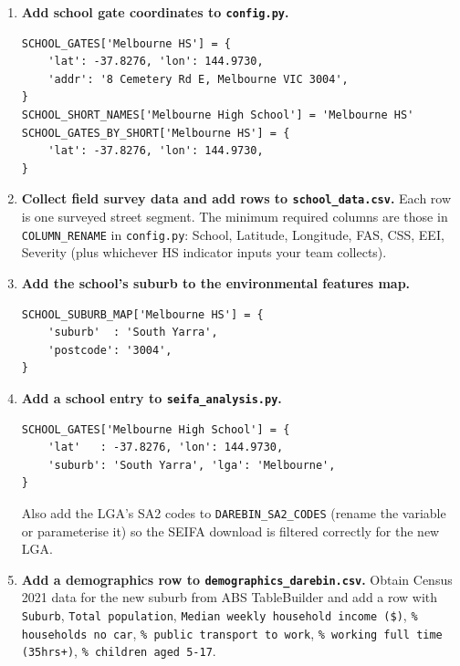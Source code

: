 \documentclass[11pt,a4paper,openany]{book}
\begin{document}
\begin{enumerate}

\item \textbf{Add school gate coordinates to \texttt{config.py}.}

\begin{lstlisting}[style=python, caption={config.py additions for a new school.}]
SCHOOL_GATES['Melbourne HS'] = {
    'lat': -37.8276, 'lon': 144.9730,
    'addr': '8 Cemetery Rd E, Melbourne VIC 3004',
}
SCHOOL_SHORT_NAMES['Melbourne High School'] = 'Melbourne HS'
SCHOOL_GATES_BY_SHORT['Melbourne HS'] = {
    'lat': -37.8276, 'lon': 144.9730,
}
\end{lstlisting}

\item \textbf{Collect field survey data and add rows to \texttt{school\_data.csv}.}
  Each row is one surveyed street segment.  The minimum required columns are those
  in \texttt{COLUMN\_RENAME} in \texttt{config.py}: School, Latitude, Longitude,
  FAS, CSS, EEI, Severity (plus whichever HS indicator inputs your team collects).

\item \textbf{Add the school's suburb to the environmental features map.}

\begin{lstlisting}[style=python, caption={environmental\_features.py suburb mapping addition.}]
SCHOOL_SUBURB_MAP['Melbourne HS'] = {
    'suburb'  : 'South Yarra',
    'postcode': '3004',
}
\end{lstlisting}

\item \textbf{Add a school entry to \texttt{seifa\_analysis.py}.}

\begin{lstlisting}[style=python, caption={seifa\_analysis.py school gate addition.}]
SCHOOL_GATES['Melbourne High School'] = {
    'lat'   : -37.8276, 'lon': 144.9730,
    'suburb': 'South Yarra', 'lga': 'Melbourne',
}
\end{lstlisting}

  Also add the LGA's SA2 codes to \texttt{DAREBIN\_SA2\_CODES} (rename the variable
  or parameterise it) so the SEIFA download is filtered correctly for the new LGA.

\item \textbf{Add a demographics row to \texttt{demographics\_darebin.csv}.}
  Obtain Census 2021 data for the new suburb from ABS TableBuilder and add a row
  with \texttt{Suburb}, \texttt{Total population}, \texttt{Median weekly household
  income (\$)}, \texttt{\% households no car}, \texttt{\% public transport to work},
  \texttt{\% working full time (35hrs+)}, \texttt{\% children aged 5-17}.

\end{enumerate}
\end{document}
